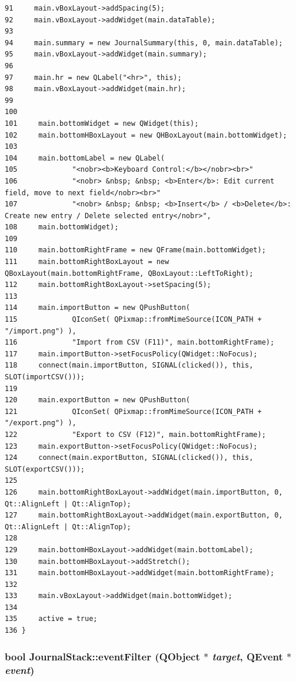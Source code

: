 \begin{verbatim}
91     main.vBoxLayout->addSpacing(5);
92     main.vBoxLayout->addWidget(main.dataTable);
93     
94     main.summary = new JournalSummary(this, 0, main.dataTable);
95     main.vBoxLayout->addWidget(main.summary);
96     
97     main.hr = new QLabel("<hr>", this);
98     main.vBoxLayout->addWidget(main.hr);
99     
100     
101     main.bottomWidget = new QWidget(this);
102     main.bottomHBoxLayout = new QHBoxLayout(main.bottomWidget);
103     
104     main.bottomLabel = new QLabel(
105             "<nobr><b>Keyboard Control:</b></nobr><br>"
106             "<nobr> &nbsp; &nbsp; <b>Enter</b>: Edit current field, move to next field</nobr><br>"
107             "<nobr> &nbsp; &nbsp; <b>Insert</b> / <b>Delete</b>: Create new entry / Delete selected entry</nobr>",
108     main.bottomWidget);
109     
110     main.bottomRightFrame = new QFrame(main.bottomWidget);
111     main.bottomRightBoxLayout = new QBoxLayout(main.bottomRightFrame, QBoxLayout::LeftToRight);
112     main.bottomRightBoxLayout->setSpacing(5);
113     
114     main.importButton = new QPushButton(
115             QIconSet( QPixmap::fromMimeSource(ICON_PATH + "/import.png") ),
116             "Import from CSV (F11)", main.bottomRightFrame);
117     main.importButton->setFocusPolicy(QWidget::NoFocus);
118     connect(main.importButton, SIGNAL(clicked()), this, SLOT(importCSV()));
119     
120     main.exportButton = new QPushButton(
121             QIconSet( QPixmap::fromMimeSource(ICON_PATH + "/export.png") ),
122             "Export to CSV (F12)", main.bottomRightFrame);
123     main.exportButton->setFocusPolicy(QWidget::NoFocus);
124     connect(main.exportButton, SIGNAL(clicked()), this, SLOT(exportCSV()));
125     
126     main.bottomRightBoxLayout->addWidget(main.importButton, 0, Qt::AlignLeft | Qt::AlignTop);
127     main.bottomRightBoxLayout->addWidget(main.exportButton, 0, Qt::AlignLeft | Qt::AlignTop);
128     
129     main.bottomHBoxLayout->addWidget(main.bottomLabel);
130     main.bottomHBoxLayout->addStretch();
131     main.bottomHBoxLayout->addWidget(main.bottomRightFrame);
132     
133     main.vBoxLayout->addWidget(main.bottomWidget);
134     
135     active = true;
136 }
\end{verbatim}\normalsize 


\hypertarget{classJournalStack_d0}{
\subsubsection[eventFilter]{\setlength{\rightskip}{0pt plus 5cm}bool Journal\-Stack::event\-Filter (QObject $\ast$ {\em target}, QEvent $\ast$ {\em event})}}
\label{classJournalStack_d0}


